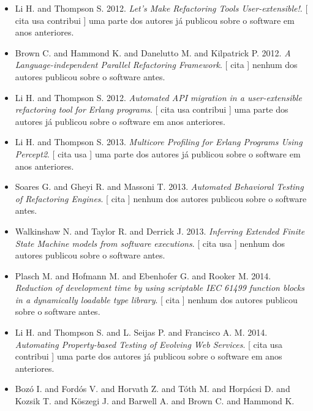 \begin{itemize}
      [
          cita
      ]
nenhum dos autores publicou sobre o software antes.
\item Li H. and Thompson S.
      2012.
        \textit{ Let's Make Refactoring Tools User-extensible!}.
      [
          cita
          usa
          contribui
      ]
uma parte dos autores já publicou sobre o software em anos anteriores.
\item Brown C. and Hammond K. and Danelutto M. and Kilpatrick P.
      2012.
        \textit{ A Language-independent Parallel Refactoring Framework}.
      [
          cita
      ]
nenhum dos autores publicou sobre o software antes.
\item Li H. and Thompson S.
      2012.
        \textit{ Automated API migration in a user-extensible refactoring tool for Erlang programs}.
      [
          cita
          usa
          contribui
      ]
uma parte dos autores já publicou sobre o software em anos anteriores.
\item Li H. and Thompson S.
      2013.
        \textit{ Multicore Profiling for Erlang Programs Using Percept2}.
      [
          cita
          usa
      ]
uma parte dos autores já publicou sobre o software em anos anteriores.
\item Soares G. and Gheyi R. and Massoni T.
      2013.
        \textit{ Automated Behavioral Testing of Refactoring Engines}.
      [
          cita
      ]
nenhum dos autores publicou sobre o software antes.
\item Walkinshaw N. and Taylor R. and Derrick J.
      2013.
        \textit{ Inferring Extended Finite State Machine models from software executions}.
      [
          cita
          usa
      ]
nenhum dos autores publicou sobre o software antes.
\item Plasch M. and Hofmann M. and Ebenhofer G. and Rooker M.
      2014.
        \textit{ Reduction of development time by using scriptable IEC 61499 function blocks in a dynamically loadable type library}.
      [
          cita
      ]
nenhum dos autores publicou sobre o software antes.
\item Li H. and Thompson S. and L. Seijas P. and Francisco A. M.
      2014.
        \textit{ Automating Property-based Testing of Evolving Web Services}.
      [
          cita
          usa
          contribui
      ]
uma parte dos autores já publicou sobre o software em anos anteriores.
\item Boz\'{o} I. and Ford\'{o}s V. and Horvath Z. and T\'{o}th M. and Horp\'{a}csi D. and Kozsik T. and K\"{o}szegi J. and Barwell A. and Brown C. and Hammond K.

\end{itemize}
